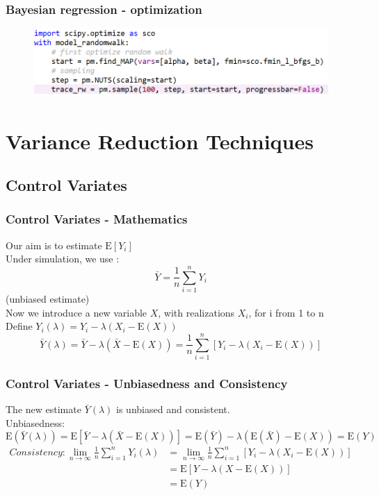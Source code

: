 \documentclass{beamer}
\begin{document}
\begin{frame}
\frametitle{Bayesian regression - optimization}
\begin{figure}[H]
	\includegraphics[scale=0.48]{bayesian_optimize.png}
\end{figure}
\end{frame}

\section{Variance Reduction Techniques} %

\subsection{Control Variates}

\begin{frame}
\frametitle{Control Variates - Mathematics}
Our aim is to estimate $\mathrm{E}[Y_{i}]$ \\
Under simulation, we use : $$\bar{Y} = \frac{1}{n} \sum_{i=1}^{n} Y_{i}$$ (unbiased estimate)\\
Now we introduce a new variable $X$, with realizations $X_{i}$, for i from 1 to n\\
Define $Y_{i}(\lambda) = Y_{i} - \lambda (X_{i} - \mathrm{E}(X))$
$$\bar{Y}(\lambda) = \bar{Y} - \lambda (\bar{X} - \mathrm{E}(X)) = \frac{1}{n} \sum_{i=1}^{n} [Y_{i} - \lambda (X_{i} - \mathrm{E}(X))]$$
\end{frame}

\begin{frame}
\frametitle{Control Variates - Unbiasedness and Consistency}
The new estimate $\bar{Y}(\lambda)$ is unbiased and consistent.\\[5mm]
Unbiasedness: $$\mathrm{E}(\bar{Y}(\lambda)) = \mathrm{E}[\bar{Y} - \lambda(\bar{X} - \mathrm{E}(X))] = \mathrm{E}(\bar{Y}) - \lambda(\mathrm{E}(\bar{X}) - \mathrm{E}(X)) = \mathrm{E}(Y) $$
\begin{equation*}
\begin{split}
Consistency: \lim_{n\to\infty} \frac{1}{n}\sum_{i=1}^{n} Y_{i}(\lambda) 
&=\lim_{n\to\infty} \frac{1}{n}\sum_{i=1}^{n} [Y_{i} - \lambda (X_{i} - \mathrm{E}(X))] \\
&= \mathrm{E}[Y - \lambda(X-\mathrm{E}(X))] \\
&= \mathrm{E}(Y) \\
\end{split}
\end{equation*}
\end{frame}
\end{document}
